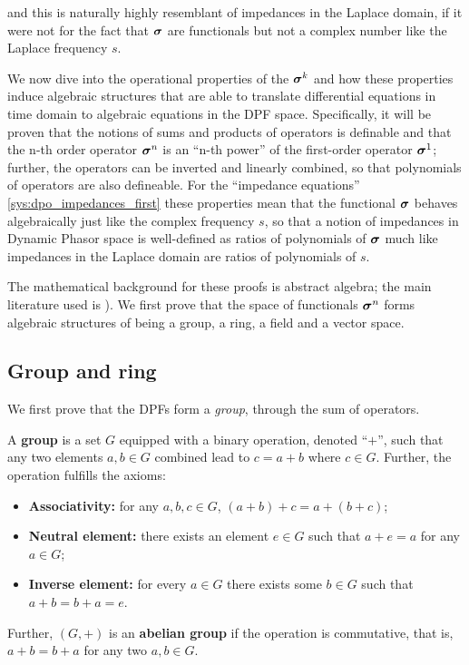 	\noindent and this is naturally highly resemblant of impedances in the Laplace domain, if it were not for the fact that $\boldsymbol{\sigma}$ are functionals but not a complex number like the Laplace frequency $s$.

	We now dive into the operational properties of the $\boldsymbol{\sigma}^{k}$ and how these properties induce algebraic structures that are able to translate differential equations in time domain to algebraic equations in the DPF space. Specifically, it will be proven that the notions of sums and products of operators is definable and that the n-th order operator $\boldsymbol{\sigma}^{n}$ is an ``n-th power'' of the first-order operator $\boldsymbol{\sigma}^{1}$; further, the operators can be inverted and linearly combined, so that polynomials of operators are also defineable. For the ``impedance equations'' \eqref{sys:dpo_impedances_first} these properties mean that the functional $\boldsymbol{\sigma}$ behaves algebraically just like the complex frequency $s$, so that a notion of impedances in Dynamic Phasor space is well-defined as ratios of polynomials of $\boldsymbol{\sigma}$ much like impedances in the Laplace domain are ratios of polynomials of $s$.

	The mathematical background for these proofs is abstract algebra; the main literature used is \cite{goncalvesIntroducaoAlgebra2021,garciaElementosAlgebra2022,hungerfordAlgebra2010,dummitAbstractAlgebra2003}). We first prove that the space of functionals $\boldsymbol{\sigma}^{n}$ forms algebraic structures of being a group, a ring, a field and a vector space.

\subsection{Group and ring}\label{subsec:group_ring}

	We first prove that the DPFs form a \textit{group}, through the sum of operators.

\begin{definition}[Group]\label{def:algebra_group}%
	A \textbf{group} is a set $G$ equipped with a binary operation, denoted ``$+$'', such that any two elements $a,b\in G$ combined lead to $c = a + b$ where $c\in G$. Further, the operation fulfills the axioms:

\begin{itemize}
	\item \textbf{Associativity:} for any $a,b,c\in G$, $\left(a + b\right) + c = a + \left( b + c\right)$;
	\item \textbf{Neutral element:} there exists an element $e\in G$ such that $a + e = a$ for any $a\in G$;
	\item \textbf{Inverse element:} for every $a\in G$ there exists some $b\in G$ such that $a + b = b + a = e$.
\end{itemize}

	Further, $\left(G,+\right)$ is an \textbf{abelian group} if the operation is commutative, that is, $a + b = b + a$ for any two $a,b\in G$.

\end{definition} %

